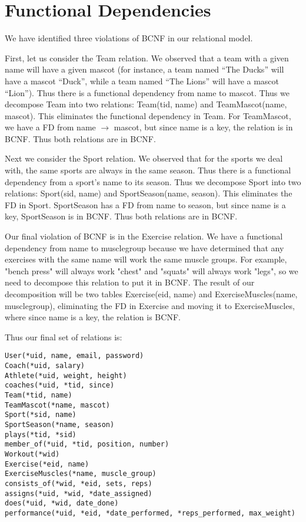 \documentclass{article}
\begin{document}
\section{Functional Dependencies}

We have identified three violations of BCNF in our relational model. 

First, let us consider the Team relation.  We observed that a team with a given name 
will have a given mascot (for instance, a team named ``The Ducks'' will have a mascot ``Duck'',
while a team named ``The Lions'' will have a mascot ``Lion''). Thus there is a 
functional dependency from name to mascot. Thus we decompose Team into two relations:
Team(tid, name) and TeamMascot(name, mascot). This eliminates the functional dependency
in Team. For TeamMascot, we have a FD from name $\to$ mascot, but since name is a key,
the relation is in BCNF. Thus both relations are in BCNF.

Next we consider the Sport relation. We observed that for the sports we deal with, the same 
sports are always in the same season. Thus there is a functional dependency from a sport's
name to its season. Thus we decompose Sport into two relations: Sport(sid, name) and 
SportSeason(name, season). This eliminates the FD in Sport. SportSeason has a FD from
name to season, but since name is a key, SportSeason is in BCNF. Thus both relations 
are in BCNF. 

Our final violation of BCNF is in the Exercise relation.  We have a functional dependency from name to muscle\underline{\hspace{2mm}}group because we have determined that any exercises with the same name will work the same muscle groups.  For example, "bench press" will always work "chest" and "squats" will always work "legs", so we need to decompose this relation to put it in BCNF.  The result of our decomposition will be two tables Exercise(eid, name) and ExerciseMuscles(name, muscle\underline{\hspace{2mm}}group), eliminating the FD in Exercise and moving it to ExerciseMuscles, where since name is a key, the relation is BCNF.

Thus our final set of relations is:
    \begin{verbatim}
User(*uid, name, email, password)
Coach(*uid, salary)
Athlete(*uid, weight, height)
coaches(*uid, *tid, since)
Team(*tid, name)
TeamMascot(*name, mascot)
Sport(*sid, name)
SportSeason(*name, season)
plays(*tid, *sid)
member_of(*uid, *tid, position, number)
Workout(*wid)
Exercise(*eid, name)
ExerciseMuscles(*name, muscle_group)
consists_of(*wid, *eid, sets, reps)
assigns(*uid, *wid, *date_assigned)
does(*uid, *wid, date_done)
performance(*uid, *eid, *date_performed, *reps_performed, max_weight)
    \end{verbatim}
\end{document}
